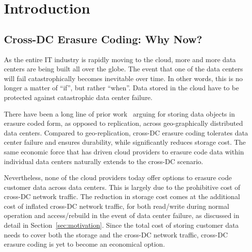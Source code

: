 \section{Introduction}

\subsection{Cross-DC Erasure Coding: Why Now?}

As the entire IT industry is rapidly moving to the cloud, more and more data
centers are being built all over the globe. The event that one of the data
centers will fail catastrophically becomes inevitable over time. In other words,
this is no longer a matter of ``if'', but rather ``when''. 
Data stored in the
cloud have to be protected against catastrophic data center failure.

There have been a long line of prior work~\cite{oceanstore:asplos00,
  pond:fast13, hail:ccs09, racs:socc10, hu12nccloud} arguing for storing data
objects in erasure coded form, as opposed to replication, across geo-graphically
distributed data centers. Compared to geo-replication, cross-DC erasure coding
tolerates data center failure and ensures durability, while significantly
reduces storage cost. The same economic force that has driven cloud providers to
erasure code data within individual data centers naturally extends to the
cross-DC scenario.

Nevertheless, none of the cloud providers today offer options to erasure code
customer data across data centers. This is largely due to the prohibitive cost
of cross-DC network traffic. The reduction in storage cost comes at the
additional cost of inflated cross-DC network traffic, for both read/write during
normal operation and access/rebuild in the event of data center failure, as
discussed in detail in Section~\ref{sec:motivation}. Since the total cost of
storing customer data needs to cover both the storage and the cross-DC network
traffic, cross-DC erasure coding is yet to become an economical option.


